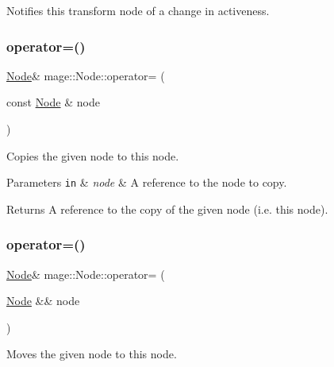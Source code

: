 Notifies this transform node of a change in activeness. \hypertarget{classmage_1_1_node_ad10ea13608963acfa06d3c1577314da5}{}\label{classmage_1_1_node_ad10ea13608963acfa06d3c1577314da5} 
\subsubsection{\texorpdfstring{operator=()}{operator=()}\hspace{0.1cm}{\footnotesize\ttfamily [1/2]}}
{\footnotesize\ttfamily \hyperlink{classmage_1_1_node}{Node}\& mage\+::\+Node\+::operator= (\begin{DoxyParamCaption}\item[{const \hyperlink{classmage_1_1_node}{Node} \&}]{node }\end{DoxyParamCaption})\hspace{0.3cm}{\ttfamily [delete]}}

Copies the given node to this node.


\begin{DoxyParams}[1]{Parameters}
\mbox{\tt in}  & {\em node} & A reference to the node to copy. \\
\hline
\end{DoxyParams}
\begin{DoxyReturn}{Returns}
A reference to the copy of the given node (i.\+e. this node). 
\end{DoxyReturn}
\hypertarget{classmage_1_1_node_a007043de35c65edb9a0d790824186151}{}\label{classmage_1_1_node_a007043de35c65edb9a0d790824186151} 
\subsubsection{\texorpdfstring{operator=()}{operator=()}\hspace{0.1cm}{\footnotesize\ttfamily [2/2]}}
{\footnotesize\ttfamily \hyperlink{classmage_1_1_node}{Node}\& mage\+::\+Node\+::operator= (\begin{DoxyParamCaption}\item[{\hyperlink{classmage_1_1_node}{Node} \&\&}]{node }\end{DoxyParamCaption})\hspace{0.3cm}{\ttfamily [delete]}}

Moves the given node to this node.


